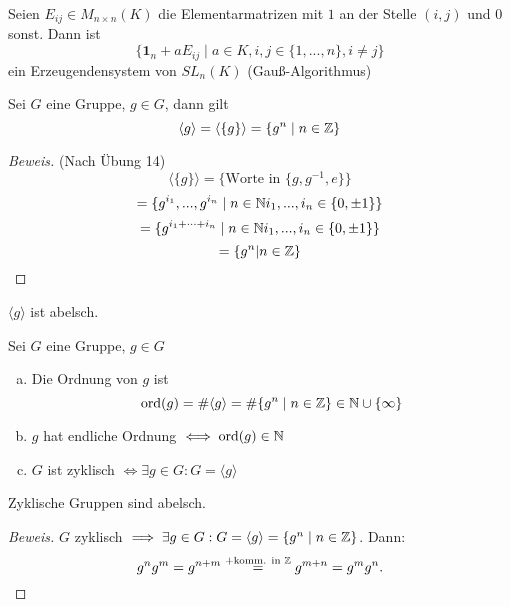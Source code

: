 \documentclass[a4paper]{report}
\begin{document}
\begin{bsp*}[Übung]
Seien $E_{ij} \in M_{n \times n}(K)$ die Elementarmatrizen mit $1$ an der Stelle $(i,j)$ und $0$ sonst. Dann ist
$$\{\mathbf 1_{n} + aE_{ij} \mid a \in K, i,j \in \{1, ..., n\}, i \neq j\}$$
ein Erzeugendensystem von $SL_{n}(K)$ (Gauß-Algorithmus)
\end{bsp*}

\begin{lemm}
Sei $G$ eine Gruppe, $g \in G$, dann gilt
$$\langle g \rangle = \langle \{g\} \rangle = \{g^{n} \mid n \in \Bbb Z\}$$
\begin{proof}[Beweis]
(Nach Übung 14) $$\langle \{g\} \rangle = \{\text{Worte in } \{g, g^{-1}, e\}\}$$
$$ = \{g^{i_{1}}, ..., g^{i_{n}} \mid n \in \Bbb N i_{1}, ..., i_{n} \in \{0, \pm 1\}\}$$
$$= \{g^{i_{1}+\cdots + i_{n}} \mid n \in \Bbb N i_{1}, ..., i_{n} \in \{0, \pm 1\}\}$$
$$= \{g^{n} | n \in \Bbb Z\}$$
\end{proof}
\end{lemm}
\begin{bem*}$\langle g \rangle$ ist abelsch.\end{bem*}

\begin{defi}
  Sei $G$ eine Gruppe, $g \in G$

\begin{enumerate}[(a)]

 \item Die Ordnung von $g$ ist
$$\mathrm{ord}(g) = \# \langle g \rangle = \# \{ g^{n} \mid n \in \Bbb{Z} \} \in \Bbb{N} \cup \{\infty\}$$
 \item$g$ hat endliche Ordnung $\iff \mathrm{ord}(g) \in \Bbb N$
 \item $G$ ist zyklisch $\iff \exists g \in G : G = \langle g \rangle$
\end{enumerate}
\end{defi}


\begin{prop}
  Zyklische Gruppen sind abelsch.
  \begin{proof}[Beweis]
$G$ zyklisch $\implies \exists g \in G : G = \langle g \rangle = \{ g^{n} \mid n \in \Bbb{Z} \}$. Dann: $$g^{n}g^{m} = g^{n+m} \overset{+ \text{komm. in } \Bbb Z}= g^{m+n} = g^{m}g^{n}.$$
  \end{proof}
\end{prop}
\end{document}
